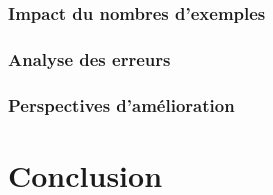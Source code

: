 \subsubsection{Impact du nombres d'exemples}
\subsubsection{Analyse des erreurs}
\subsubsection{Perspectives d'amélioration}

\section{Conclusion}
\label{sec:quanta:conclusion}

